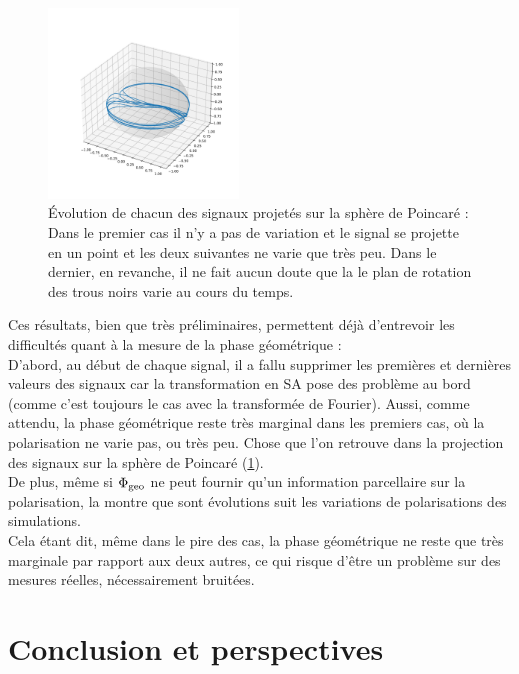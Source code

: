 \begin{figure}[h]
	\includegraphics[width=0.45\textwidth]{fig/part-3/GW_proj_full4.pdf}
	\caption[ Évolution de chacun des signaux projetés sur la sphère de Poincaré]{Évolution de chacun des signaux projetés sur la sphère de Poincaré : Dans le premier cas il n'y a pas de variation et le signal se projette en un point et les deux suivantes ne varie que très peu. Dans le dernier, en revanche, il ne fait aucun doute que la le plan de rotation des trous noirs varie au cours du temps.}
	\label{fig:GW_sur_Poincare}
\end{figure}

Ces résultats, bien que très préliminaires, permettent déjà d'entrevoir les difficultés quant à la mesure de la phase géométrique :
\\
D'abord, au début de chaque signal, il a fallu supprimer les premières et dernières valeurs des signaux car la transformation en SA pose des problème au bord (comme c'est toujours le cas avec la transformée de Fourier). 
Aussi, comme attendu, la phase géométrique reste très marginal dans les premiers cas, où la polarisation ne varie pas, ou très peu. 
Chose que l'on retrouve dans la projection des signaux sur la sphère de Poincaré (\cref{fig:GW_sur_Poincare}). 
\\
De plus, même si $\Phi_{\text{\normalfont geo}}$ ne peut fournir qu'un information parcellaire sur la polarisation, la  montre que sont évolutions suit les variations de polarisations des simulations.
\\
Cela étant dit, même dans le pire des cas, la phase géométrique ne reste que très marginale par rapport aux deux autres, ce qui risque d'être un problème sur des mesures réelles, nécessairement bruitées.
\\




\section{Conclusion et perspectives}

